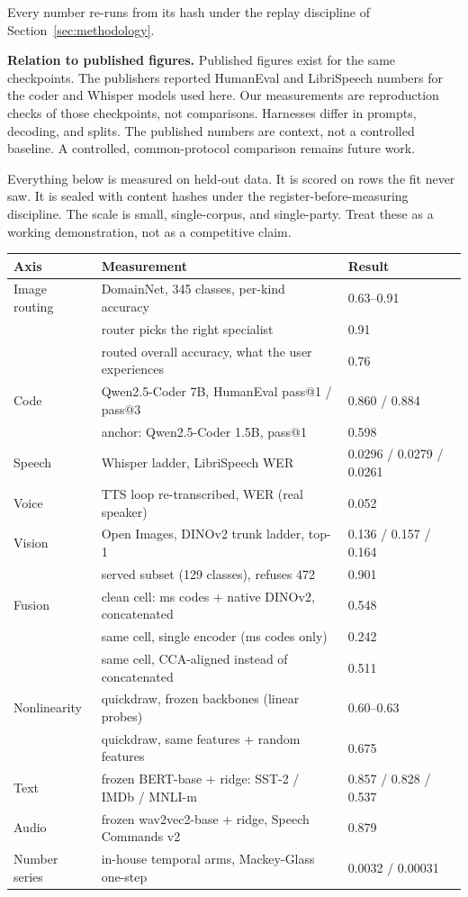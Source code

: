 \documentclass[11pt]{article}
\begin{document}
Every number re-runs from its hash under the replay discipline of
Section~\ref{sec:methodology}.

\textbf{Relation to published figures.} Published figures exist
for the same checkpoints. The publishers reported HumanEval and
LibriSpeech numbers for the coder and Whisper models used here.
Our measurements are reproduction checks of those checkpoints,
not comparisons. Harnesses differ in prompts, decoding, and
splits. The published numbers are context, not a controlled
baseline. A controlled, common-protocol comparison remains future
work.

Everything below is measured on held-out data. It is scored on
rows the fit never saw. It is sealed with content hashes under the
register-before-measuring discipline. The scale is small,
single-corpus, and single-party. Treat these as a working
demonstration, not as a competitive claim.

\begin{center}
\begin{tabular}{@{}lll@{}}
\toprule
\textbf{Axis} & \textbf{Measurement} & \textbf{Result} \\
\midrule
Image routing & DomainNet, 345 classes, per-kind accuracy & 0.63--0.91 \\
& router picks the right specialist & 0.91 \\
& routed overall accuracy, what the user experiences & 0.76 \\
Code & Qwen2.5-Coder 7B, HumanEval pass@1 / pass@3 & 0.860 / 0.884 \\
& anchor: Qwen2.5-Coder 1.5B, pass@1 & 0.598 \\
Speech & Whisper ladder, LibriSpeech WER & 0.0296 / 0.0279 / 0.0261 \\
Voice & TTS loop re-transcribed, WER (real speaker) & 0.052 \\
Vision & Open Images, DINOv2 trunk ladder, top-1 & 0.136 / 0.157 / 0.164 \\
& served subset (129 classes), refuses 472 & 0.901 \\
Fusion & clean cell: ms codes + native DINOv2, concatenated & 0.548 \\
& same cell, single encoder (ms codes only) & 0.242 \\
& same cell, CCA-aligned instead of concatenated & 0.511 \\
Nonlinearity & quickdraw, frozen backbones (linear probes) & 0.60--0.63 \\
& quickdraw, same features + random features & 0.675 \\
Text & frozen BERT-base + ridge: SST-2 / IMDb / MNLI-m & 0.857 / 0.828 / 0.537 \\
Audio & frozen wav2vec2-base + ridge, Speech Commands v2 & 0.879 \\
Number series & in-house temporal arms, Mackey-Glass one-step & 0.0032 / 0.00031 \\
\bottomrule
\end{tabular}
\end{center}
\end{document}
